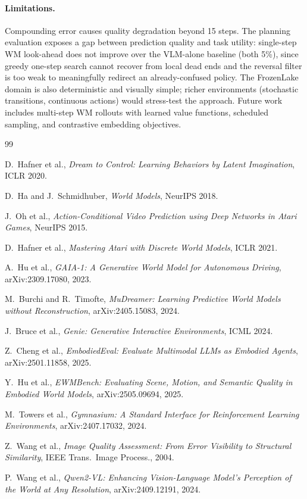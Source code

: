 \documentclass[11pt]{article}
\begin{document}
\paragraph{Limitations.}
Compounding error causes quality degradation beyond 15 steps.
The planning evaluation exposes a gap between prediction quality and task utility:
single-step WM look-ahead does not improve over the VLM-alone baseline (both 5\%),
since greedy one-step search cannot recover from local dead ends and the reversal
filter is too weak to meaningfully redirect an already-confused policy.
The FrozenLake domain is also deterministic and visually simple; richer environments
(stochastic transitions, continuous actions) would stress-test the approach.
Future work includes multi-step WM rollouts with learned value functions,
scheduled sampling, and contrastive embedding objectives.


{\small
\begin{thebibliography}{99}

D.~Hafner et al.,
\emph{Dream to Control: Learning Behaviors by Latent Imagination},
ICLR 2020.

D.~Ha and J.~Schmidhuber,
\emph{World Models},
NeurIPS 2018.

J.~Oh et al.,
\emph{Action-Conditional Video Prediction using Deep Networks in Atari Games},
NeurIPS 2015.

D.~Hafner et al.,
\emph{Mastering Atari with Discrete World Models},
ICLR 2021.

A.~Hu et al.,
\emph{GAIA-1: A Generative World Model for Autonomous Driving},
arXiv:2309.17080, 2023.

M.~Burchi and R.~Timofte,
\emph{MuDreamer: Learning Predictive World Models without Reconstruction},
arXiv:2405.15083, 2024.

J.~Bruce et al.,
\emph{Genie: Generative Interactive Environments},
ICML 2024.

Z.~Cheng et al.,
\emph{EmbodiedEval: Evaluate Multimodal LLMs as Embodied Agents},
arXiv:2501.11858, 2025.

Y.~Hu et al.,
\emph{EWMBench: Evaluating Scene, Motion, and Semantic Quality in Embodied World Models},
arXiv:2505.09694, 2025.

M.~Towers et al.,
\emph{Gymnasium: A Standard Interface for Reinforcement Learning Environments},
arXiv:2407.17032, 2024.

Z.~Wang et al.,
\emph{Image Quality Assessment: From Error Visibility to Structural Similarity},
IEEE Trans.\ Image Process., 2004.

P.~Wang et al.,
\emph{Qwen2-VL: Enhancing Vision-Language Model's Perception of the World at Any Resolution},
arXiv:2409.12191, 2024.

\end{thebibliography}
}
\end{document}
